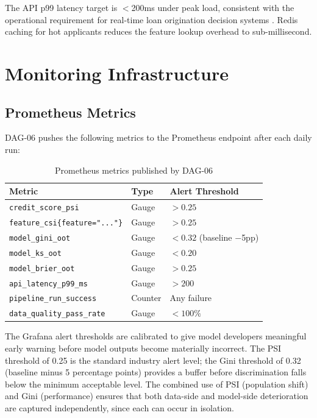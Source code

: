 \documentclass[12pt,a4paper]{report}
\begin{document}
The API p99 latency target is $<$200ms under peak load, consistent with the operational requirement for real-time loan origination decision systems \cite{mathworks}. Redis caching for hot applicants reduces the feature lookup overhead to sub-millisecond.

\chapter{Monitoring Infrastructure}
\label{ch:monitoring}

\section{Prometheus Metrics}

DAG-06 pushes the following metrics to the Prometheus endpoint after each daily run:

\begin{table}[H]
\centering
\caption{Prometheus metrics published by DAG-06}
\label{tab:metrics}
\begin{tabular}{lll}
\toprule
\textbf{Metric} & \textbf{Type} & \textbf{Alert Threshold} \\
\midrule
\texttt{credit\_score\_psi}            & Gauge   & $>0.25$ \\
\texttt{feature\_csi\{feature="..."\}} & Gauge   & $>0.25$ \\
\texttt{model\_gini\_oot}              & Gauge   & $<0.32$ (baseline $-$5pp) \\
\texttt{model\_ks\_oot}                & Gauge   & $<0.20$ \\
\texttt{model\_brier\_oot}             & Gauge   & $>0.25$ \\
\texttt{api\_latency\_p99\_ms}         & Gauge   & $>200$ \\
\texttt{pipeline\_run\_success}        & Counter & Any failure \\
\texttt{data\_quality\_pass\_rate}     & Gauge   & $<100\%$ \\
\bottomrule
\end{tabular}
\end{table}

\medskip
\noindent The Grafana alert thresholds are calibrated to give model developers meaningful early warning before model outputs become materially incorrect. The PSI threshold of 0.25 is the standard industry alert level; the Gini threshold of 0.32 (baseline minus 5 percentage points) provides a buffer before discrimination falls below the minimum acceptable level. The combined use of PSI (population shift) and Gini (performance) ensures that both data-side and model-side deterioration are captured independently, since each can occur in isolation.
\end{document}
